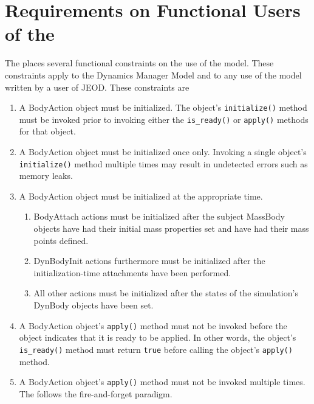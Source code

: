 \section*{Requirements on Functional Users of the \ModelDesc}
The \ModelDesc places several functional constraints on the use of the model.
These constraints apply to the Dynamics Manager Model and to any
use of the model written by a user of JEOD.
These constraints are
\begin{enumerate}
\item A BodyAction object must be initialized.
The object's {\tt initialize()} method must be invoked prior to invoking
either the {\tt is\_ready()} or {\tt apply()} methods for that object.
\item A BodyAction object must be initialized once only.
Invoking a single object's {\tt initialize()} method multiple times may
result in undetected errors such as memory leaks.
\item A BodyAction object must be initialized at the appropriate time.
\begin{enumerate}
\item BodyAttach actions must be initialized
after the subject MassBody objects have had their initial mass properties
set and have had their mass points defined.
\item  DynBodyInit actions furthermore must be initialized after
the initialization-time attachments have been performed.
\item All other actions must be initialized after the states of the
simulation's DynBody objects have been set.
\end{enumerate}
\item A BodyAction object's {\tt apply()} method must not be invoked
before the object indicates that it is ready to be applied. In other words,
the object's {\tt is\_ready()} method must return {\tt true} before
calling the object's {\tt apply()} method.
\item A BodyAction object's {\tt apply()} method must not be invoked
multiple times. The \ModelDesc follows the fire-and-forget paradigm.
\end{enumerate}

